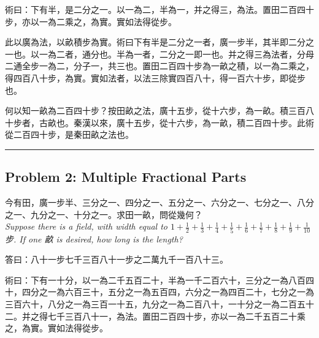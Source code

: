 \documentclass[11pt,a4paper]{article}
\newcommand{\zh}[1]{#1}
\newcommand{\longline}{\noindent\rule{\textwidth}{0.4pt}}
\begin{document}
\begin{method}[\zh{術} · Method]
\zh{%
術曰：下有半，是二分之一。以一為二，半為一，并之得三，為法。置田二百四十步，亦以一為二乘之，為實。實如法得從步。
}
\end{method}

\begin{commentary}[\zh{劉徽注}]
\zh{%
此以廣為法，以畝積步為實。術曰下有半是二分之一者，廣一步半，其半即二分之一也。以一為二者，通分也。半為一者，二分之一即一也。并之得三為法者，分母二通全步一為二，分子一，共三也。置田二百四十步為一畝之積，以一為二乘之，得四百八十步，為實。實如法者，以法三除實四百八十，得一百六十步，即從步也。

何以知一畝為二百四十步？按田畝之法，廣十五步，從十六步，為一畝。積三百八十步者，古畝也。秦漢以來，廣十五步，從十六步，為一畝，積二百四十步。此術從二百四十步，是秦田畝之法也。
}
\end{commentary}

\vspace{0.5cm}
\longline
\vspace{0.3cm}

\subsection{Problem 2: Multiple Fractional Parts}

\begin{problem}[\zh{少廣第二} · Problem 2]
\zh{%
今有田，廣一步半、三分之一、四分之一、五分之一、六分之一、七分之一、八分之一、九分之一、十分之一。求田一畝，問從幾何？
}\\[0.3em]
\textit{Suppose there is a field, with width equal to $1 + \frac{1}{2} + \frac{1}{3} + \frac{1}{4} + \frac{1}{5} + \frac{1}{6} + \frac{1}{7} + \frac{1}{8} + \frac{1}{9} + \frac{1}{10}$ \zh{步}. If one \zh{畝} is desired, how long is the length?}
\end{problem}

\begin{answer}[\zh{答}]
\zh{%
答曰：八十一步七千三百八十一步之二萬九千一百八十三。
}
\end{answer}

\begin{method}[\zh{術} · Method]
\zh{%
術曰：下有一十分，以一為二千五百二十，半為一千二百六十，三分之一為八百四十，四分之一為六百三十，五分之一為五百四，六分之一為四百二十，七分之一為三百六十，八分之一為三百一十五，九分之一為二百八十，一十分之一為二百五十二。并之得七千三百八十一，為法。置田二百四十步，亦以一為二千五百二十乘之，為實。實如法得從步。
}
\end{method}
\end{document}
